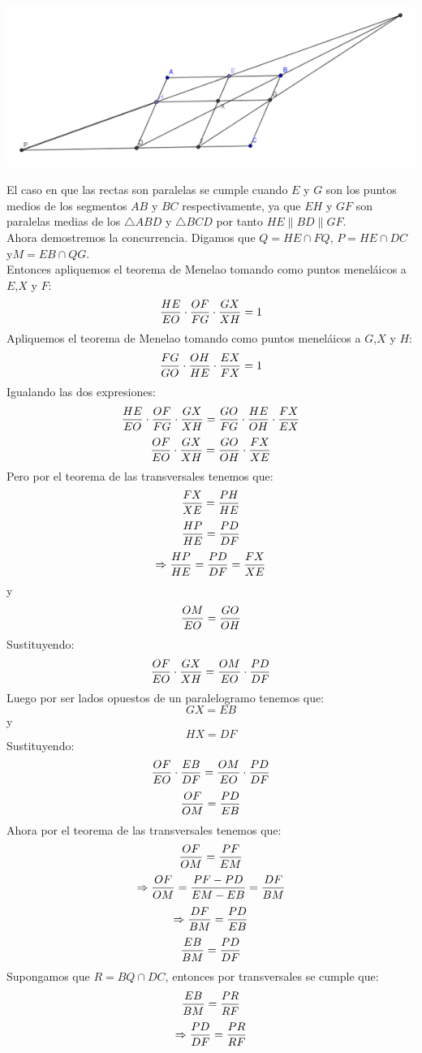 \documentclass{book}
\begin{document}
\begin{enumerate}
\begin{center}
            \includegraphics[scale=1]{imagenes/Geometria/14.png}
        \end{center}
        El caso en que las rectas son paralelas se cumple cuando $E$ y $G$ son los puntos medios de los segmentos $AB$ y $BC$ respectivamente, ya que $EH$ y $GF$ son paralelas medias de los $\triangle ABD$ y $\triangle BCD$ por tanto $HE\parallel BD\parallel GF$.\\
        Ahora demostremos la concurrencia. Digamos que $Q=HE\cap FQ$, $P=HE\cap DC$ y$ M=EB\cap QG$.\\
        Entonces apliquemos el teorema de Menelao tomando como puntos meneláicos a $E$,$X$ y $F$:
        $${HE\over EO}\cdot{OF\over FG}\cdot{GX\over XH}=1$$
        Apliquemos el teorema de Menelao tomando como puntos meneláicos a $G$,$X$ y $H$:
        $${FG\over GO}\cdot{OH\over HE}\cdot{EX\over FX}=1$$
        Igualando las dos expresiones:
        $${HE\over EO}\cdot{OF\over FG}\cdot{GX\over XH}={GO\over FG}\cdot{HE\over OH}\cdot{FX\over EX}$$
        $${OF\over EO}\cdot{GX\over XH}={GO\over OH}\cdot{FX\over XE}$$
        Pero por el teorema de las transversales tenemos que:
        $${FX\over XE}={PH\over HE}$$
        $${HP\over HE}={PD\over DF}$$
        $$\Rightarrow{HP\over HE}={PD\over DF}={FX\over XE}$$
        y
        $${OM\over EO}={GO\over OH}$$
        Sustituyendo:
        $${OF\over EO}\cdot{GX\over XH}={OM\over EO}\cdot{PD\over DF}$$
        Luego por ser lados opuestos de un paralelogramo tenemos que:
        $$GX=EB$$
        y
        $$HX=DF$$
        Sustituyendo:
        $${OF\over EO}\cdot{EB\over DF}={OM\over EO}\cdot{PD\over DF}$$
        $${OF\over OM}={PD\over EB}$$
        Ahora por el teorema de las transversales tenemos que:
        $${OF\over OM}={PF\over EM}$$
        $$\Rightarrow{OF\over OM}=\frac{PF-PD}{EM-EB}={DF\over BM}$$
        $$\Rightarrow{DF\over BM}={PD\over EB}$$
        $${EB\over BM}={PD\over DF}$$
        Supongamos que $R=BQ\cap DC$, entonces por transversales se cumple que:
        $${EB\over BM}={PR\over RF}$$
        $$\Rightarrow{PD\over DF}={PR\over RF}$$

\end{enumerate}
\end{document}
